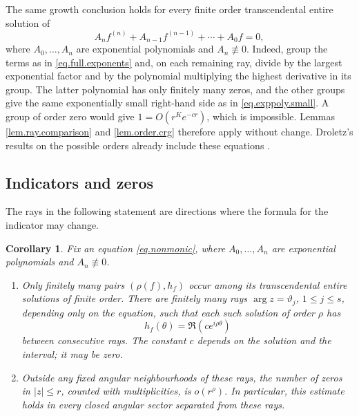 \documentclass[a4paper,12pt]{article}
\newtheorem{corollary}[defin]{Corollary}
\newenvironment{remark}
{\par\vspace{2.5mm}\noindent{\bf Remark.}}{\par\vspace{2.5mm}}
\numberwithin{equation}{section}
\begin{document}
\begin{remark}\label{rem.nonmonic}
The same growth conclusion holds for every finite order transcendental
entire solution of
\begin{equation}\label{eq.nonmonic}
 A_n f^{(n)}+A_{n-1}f^{(n-1)}+\cdots+A_0f=0,
\end{equation}
where $A_0,\ldots,A_n$ are exponential polynomials and
$A_n\not\equiv0$.
Indeed, group the terms as in \eqref{eq.full.exponents} and, on each
remaining ray, divide by the largest exponential factor and by the
polynomial multiplying the highest derivative in its group.
The latter polynomial has only finitely many zeros, and the other
groups give the same exponentially small right-hand side as in
\eqref{eq.exppoly.small}. A group of order zero would give
$1=O(r^K e^{-cr})$, which is impossible.
Lemmas \ref{lem.ray.comparison} and \ref{lem.order.crg} therefore
apply without change.
Droletz's results on the possible orders already include these equations
\cite{Droletz}.
\end{remark}

\subsection{Indicators and zeros}\label{subsec.consequences}
The rays in the following statement are directions where the formula
for the indicator may change.

\begin{corollary}\label{cor.indicator.zeros}
Fix an equation \eqref{eq.nonmonic}, where $A_0,\ldots,A_n$ are
exponential polynomials and $A_n\not\equiv0$.
\begin{enumerate}
\item Only finitely many pairs $(\rho(f),h_f)$ occur among its
transcendental entire solutions of finite order.
There are finitely many rays $\arg z=\vartheta_j$, $1\le j\le s$,
depending only on the equation, such that each such solution of
order $\rho$ has
\[
 h_f(\theta)=\Re(c e^{i\rho\theta})
\]
between consecutive rays. The constant $c$ depends on the solution
and the interval; it may be zero.

\item Outside any fixed angular neighbourhoods of these rays, the
number of zeros in $|z|\le r$, counted with multiplicities, is
$o(r^\rho)$.
In particular, this estimate holds in every closed angular sector
separated from these rays.
\end{enumerate}
\end{corollary}
\end{document}
